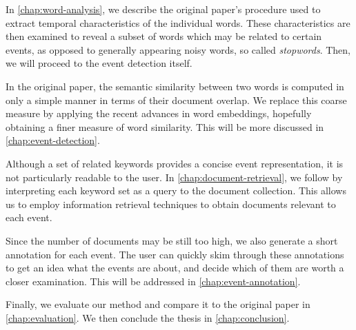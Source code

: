 In \autoref{chap:word-analysis}, we describe the original paper's procedure used to extract temporal characteristics of the individual words. These characteristics are then examined to reveal a subset of words which may be related to certain events, as opposed to generally appearing noisy words, so called \textit{stopwords}. Then, we will proceed to the event detection itself.

In the original paper, the semantic similarity between two words is computed in only a simple manner in terms of their document overlap. We replace this coarse measure by applying the recent advances in word embeddings, hopefully obtaining a finer measure of word similarity. This will be more discussed in \autoref{chap:event-detection}.

Although a set of related keywords provides a concise event representation, it is not particularly readable to the user. In \autoref{chap:document-retrieval}, we follow by interpreting each keyword set as a query to the document collection. This allows us to employ information retrieval techniques to obtain documents relevant to each event.

Since the number of documents may be still too high, we also generate a short annotation for each event. The user can quickly skim through these annotations to get an idea what the events are about, and decide which of them are worth a closer examination. This will be addressed in \autoref{chap:event-annotation}.

Finally, we evaluate our method and compare it to the original paper in \autoref{chap:evaluation}. We then conclude the thesis in \autoref{chap:conclusion}.